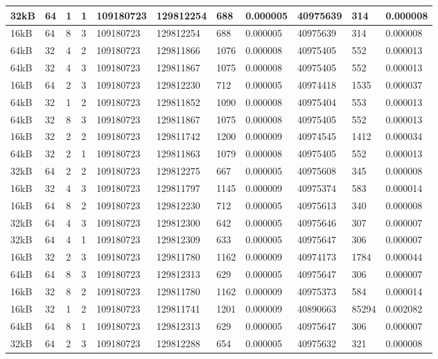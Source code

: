\documentclass[conference]{IEEEtran}
\begin{document}
\begin{table}
\begin{tabular}{|m{.75cm} |m{.75cm} |m{.8cm} | m{.75cm} | l | l | l | l | l | l | l |}
32kB&	64&	1&	1&	109180723&	129812254&	688	&  0.000005&	40975639	&314	  &0.000008 \\ \hline
16kB&	64&	8&	3&	109180723&	129812254&	688	&  0.000005&	40975639	&314	  &0.000008 \\ \hline
64kB&	32&	4&	2&	109180723&	129811866&	1076&	0.000008	&40975405	  &552	  &0.000013 \\ \hline
64kB&	32&	4&	3&	109180723&	129811867&	1075&	0.000008	&40975405	  &552	  &0.000013 \\ \hline
16kB&	64&	2&	3&	109180723&	129812230&	712	&  0.000005&	40974418&	1535	&0.000037 \\ \hline
64kB&	32&	1&	2&	109180723&	129811852&	1090&	0.000008	&40975404	  &553	  &0.000013 \\ \hline
64kB&	32&	8&	3&	109180723&	129811867&	1075&	0.000008	&40975405	  &552	  &0.000013 \\ \hline
16kB&	32&	2&	2&	109180723&	129811742&	1200&	0.000009	&40974545	 & 1412	&0.000034 \\ \hline
64kB&	32&	2&	1&	109180723&	129811863&	1079&	0.000008	&40975405	  &552	  &0.000013 \\ \hline
32kB&	64&	2&	2&	109180723&	129812275&	667	&  0.000005&	40975608	&345	  &0.000008 \\ \hline
16kB&	32&	4&	3&	109180723&	129811797&	1145&	0.000009	&40975374	  &583	  &0.000014 \\ \hline
16kB&	64&	8&	2&	109180723&	129812230&	712	&  0.000005&	40975613	&340	  &0.000008 \\ \hline
32kB&	64&	4&	3&	109180723&	129812300&	642	&  0.000005&	40975646	&307	  &0.000007 \\ \hline
32kB&	64&	4&	1&	109180723&	129812309&	633	&  0.000005&	40975647	&306	  &0.000007 \\ \hline
16kB&	32&	2&	3&	109180723&	129811780&	1162&	0.000009	&40974173	 & 1784	&0.000044 \\ \hline
64kB&	64&	8&	3&	109180723&	129812313&	629	&  0.000005&	40975647	&306	  &0.000007 \\ \hline
16kB&	32&	8&	2&	109180723&	129811780&	1162&	0.000009	&40975373	  &584	  &0.000014 \\ \hline
16kB&	32&	1&	2&	109180723&	129811741&	1201&	0.000009	&40890663	  &85294	&0.002082 \\ \hline
64kB&	64&	8&	1&	109180723&	129812313&	629	&  0.000005&	40975647	&306	  &0.000007 \\ \hline
32kB&	64&	2&	3&	109180723&	129812288&	654	&  0.000005&	40975632	&321	  &0.000008 \\ \hline

\end{tabular}
\end{table}
\end{document}
